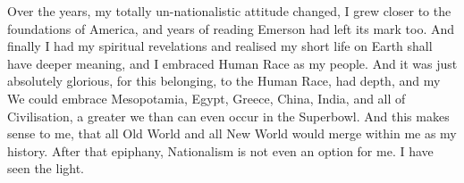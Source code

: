 \documentclass{amsart}
\begin{document}
Over the years, my totally un-nationalistic attitude changed, I grew closer to the foundations of America, and years of reading Emerson had left its mark too.  And finally I had my spiritual revelations and realised my short life on Earth shall have deeper meaning, and I embraced Human Race as my people.  And it was just absolutely glorious, for this belonging, to the Human Race, had depth, and my We could embrace Mesopotamia, Egypt, Greece, China, India, and all of Civilisation, a greater we than can even occur in the Superbowl.  And this makes sense to me, that all Old World and all New World would merge within me as my history.  After that epiphany, Nationalism is not even an option for me.  I have seen the light.
\end{document}
